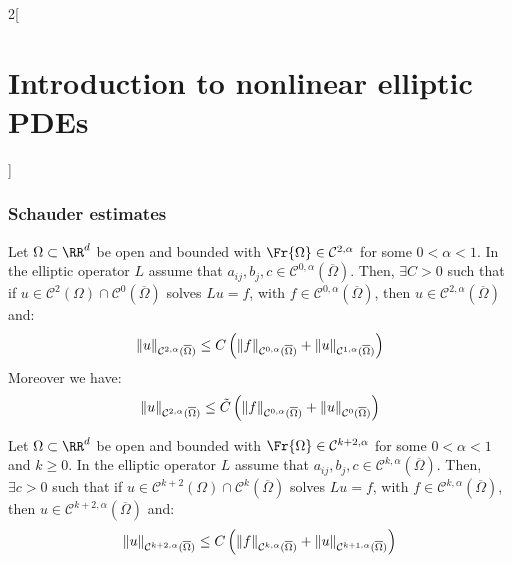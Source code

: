 \documentclass[../../../main_math.tex]{subfiles}
\begin{document}
\begin{multicols}{2}[\section{Introduction to nonlinear elliptic PDEs}]
  \subsubsection{Schauder estimates}
  \begin{theorem}\label{INEPDE:schauder_estimates}
    Let $\Omega\subset \RR^d$ be open and bounded with $\Fr{\Omega}\in\mathcal{C}^{2,\alpha}$ for some $0<\alpha<1$. In the elliptic operator $L$ assume that $a_{ij},b_j,c\in\mathcal{C}^{0,\alpha}(\overline{\Omega})$. Then, $\exists C>0$ such that if $u\in\mathcal{C}^2(\Omega)\cap \mathcal{C}^0(\overline{\Omega})$ solves $Lu=f$, with $f\in\mathcal{C}^{0,\alpha}(\overline{\Omega})$, then $u\in \mathcal{C}^{2,\alpha}(\overline{\Omega})$ and:
    $$
      \norm{u}_{\mathcal{C}^{2,\alpha}(\overline{\Omega})}\leq C\left(\norm{f}_{\mathcal{C}^{0,\alpha}(\overline{\Omega})}+\norm{u}_{\mathcal{C}^{1,\alpha}(\overline{\Omega})}\right)
    $$
    Moreover we have:
    $$
      \norm{u}_{\mathcal{C}^{2,\alpha}(\overline{\Omega})}\leq \tilde{C}\left(\norm{f}_{\mathcal{C}^{0,\alpha}(\overline{\Omega})}+\norm{u}_{\mathcal{C}^{0}(\overline{\Omega})}\right)
    $$
  \end{theorem}
  \begin{corollary}
    Let $\Omega\subset \RR^d$ be open and bounded with $\Fr{\Omega}\in\mathcal{C}^{k+2,\alpha}$ for some $0<\alpha<1$ and $k\geq 0$. In the elliptic operator $L$ assume that $a_{ij},b_j,c\in\mathcal{C}^{k,\alpha}(\overline{\Omega})$. Then, $\exists c>0$ such that if $u\in\mathcal{C}^{k+2}(\Omega)\cap \mathcal{C}^k(\overline{\Omega})$ solves $Lu=f$, with $f\in\mathcal{C}^{k,\alpha}(\overline{\Omega})$, then $u\in \mathcal{C}^{k+2,\alpha}(\overline{\Omega})$ and:
    $$
      \norm{u}_{\mathcal{C}^{k+2,\alpha}(\overline{\Omega})}\leq C\left(\norm{f}_{\mathcal{C}^{k,\alpha}(\overline{\Omega})}+\norm{u}_{\mathcal{C}^{k+1,\alpha}(\overline{\Omega})}\right)
    $$
  \end{corollary}

\end{multicols}
\end{document}
